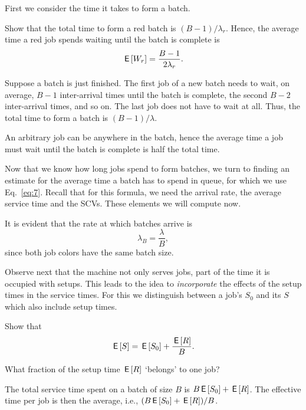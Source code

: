 First we consider the time it takes to form a batch. 
\begin{exercise}[\faFlask]
  Show that the total time to form a red batch is $(B-1)/\lambda_r$. Hence, the average time a red job spends waiting until the batch is complete is
\begin{equation*}
  \,\mathsf{E}\left[W_r\right] = \frac{B-1}{2\lambda_r}.
\end{equation*}
\begin{solution}
  Suppose a batch is just finished. The first job of a new batch needs to wait, on average, $B-1$  inter-arrival times until the batch is complete, the second $B-2$ inter-arrival times, and so on. The last job does not have to wait at all. Thus, the total time to form a batch is $(B-1)/\lambda$. 

An arbitrary job can be anywhere in the batch, hence the average time a job must wait until the batch is complete is half the total time. 
\end{solution}
\end{exercise}

Now that we know how long jobs spend to form batches, we turn to finding an estimate for the average time a batch has to spend in queue, for which we use Eq.~\eqref{eq:7}. Recall that for  this formula, we need the arrival rate, the average service time and the SCVs. These elements we will compute now. 

It is evident that the  rate at which batches arrive is 
\begin{equation*}
  \lambda_B = \frac \lambda B,
\end{equation*}
since both job colors have the same batch size.  

Observe next that the machine not only  serves jobs, part of the time it is  occupied with setups. This leads to the idea to  \emph{incorporate} the effects of the setup times in the service times. For this we distinguish between a job's  $S_0$  and its  $S$ which also include setup times. 

\begin{exercise}[\faFlask]
  Show that
  \begin{equation*}
    \,\mathsf{E}\left[S\right] = \,\mathsf{E}\left[S_0\right] + \frac{\,\mathsf{E}\left[R\right]} B.
  \end{equation*}
  \begin{hint}
    What fraction of the setup time $\,\mathsf{E}\left[R\right]$ `belongs' to one job?
  \end{hint}
  \begin{solution}
    The total service time spent on a batch of size $B$ is $B \,\mathsf{E}\left[S_0\right] + \,\mathsf{E}\left[R\right]$. The effective time per job is then the average, i.e.,  $(B \,\mathsf{E}\left[S_0\right]+\,\mathsf{E}\left[R\right])/B$. 
  \end{solution}
\end{exercise}

